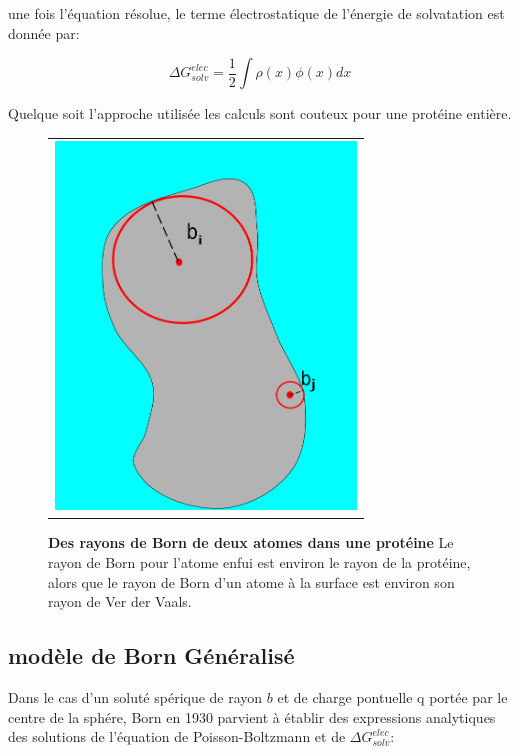 une fois l'équation résolue, le terme électrostatique de l'énergie de solvatation est donnée par:

\begin{equation}
\Delta G_{solv}^{elec} = \frac{1}{2} \int \rho(x)\phi(x)dx  
\end{equation}

Quelque soit l'approche utilisée les calculs sont couteux pour une protéine entière.



   \begin{figure}[t]
     \centering
     \begin{tabular}{c}
       \includegraphics[width=8cm]{figure/rayon_Born.png} &
     \end{tabular}
     
     \caption{\textbf{Des rayons de Born de deux atomes dans une protéine} Le rayon de Born pour l'atome enfui est environ le rayon de la protéine, alors que le rayon de Born d'un atome à la surface est environ son rayon de Ver der Vaals.} 
\label{graph:surface}
   \end{figure}



\subsection{modèle de Born Généralisé}
\label{sub:GB}
Dans le cas d'un soluté spérique de rayon $b$ et de charge pontuelle q portée par le centre de la sphére, Born en 1930  parvient à établir des expressions analytiques des solutions de l'équation de Poisson-Boltzmann et de $ \Delta G_{solv}^{elec}$:


